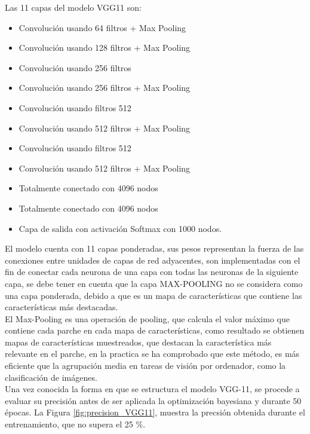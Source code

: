 			Las 11 capas del modelo VGG11 son:
				\begin{itemize}
					\item Convolución usando 64 filtros + Max Pooling
					\item Convolución usando 128 filtros + Max Pooling
					\item Convolución usando 256 filtros
					\item Convolución usando 256 filtros + Max Pooling
					\item Convolución usando filtros 512
					\item Convolución usando 512 filtros + Max Pooling
					\item Convolución usando filtros 512
					\item Convolución usando 512 filtros + Max Pooling
					\item Totalmente conectado con 4096 nodos
					\item Totalmente conectado con 4096 nodos
					\item Capa de salida con activación Softmax con 1000 nodos.
				\end{itemize}
			
			El modelo cuenta con 11 capas ponderadas, sus pesos representan la fuerza de las conexiones entre unidades de capas de red adyacentes, son implementadas con el fin de conectar cada neurona de una capa con todas las neuronas de la siguiente capa, se debe tener en cuenta que la capa MAX-POOLING no se considera como una capa ponderada, debido a que es un mapa de características que contiene las características más destacadas.\\
			
			 El Max-Pooling es una operación de pooling, que calcula el valor máximo que contiene cada parche en cada mapa de características, como resultado se obtienen mapas de características muestreados, que destacan la característica más relevante en el parche, en la practica se ha comprobado que este método, es más eficiente que la agrupación media en tareas de visión por ordenador, como la clasificación de imágenes.\\		 
			 

			Una vez conocida la forma en que se estructura el modelo VGG-11, se procede a evaluar su precisión antes de ser aplicada la optimización bayesiana y durante 50 épocas. La Figura \ref{fig:precision_VGG11}, muestra la precsión obtenida durante el entrenamiento, que no supera el 25 \%.
			
